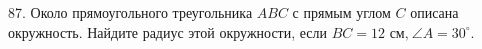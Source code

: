 87. Около прямоугольного треугольника $ABC$ с прямым углом $C$ описана окружность. Найдите радиус этой окружности, если $BC=12\text{ см,}\ \angle A=30^\circ.$\\
